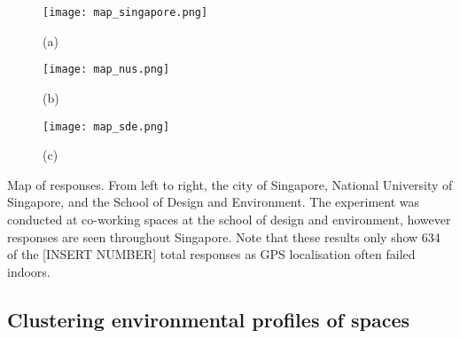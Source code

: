     \centering
    \begin{subfigure}[t]{0.3\textwidth}
        \centering
        \texttt{[image: map\_singapore.png]}
        \caption{(a)}
    \end{subfigure}
    \begin{subfigure}[t]{0.3\textwidth}
        \centering
        \texttt{[image: map\_nus.png]}
        \caption{(b)}
    \end{subfigure}
    \begin{subfigure}[t]{0.3\textwidth}
        \centering
        \texttt{[image: map\_sde.png]}
        \caption{(c)}
    \end{subfigure}
    \caption{Map of responses. From left to right, the city of Singapore, National University of Singapore, and the School of Design and Environment. The experiment was conducted at co-working spaces at the school of design and environment, however responses are seen throughout Singapore. Note that these results only show 634 of the [INSERT NUMBER] total responses as GPS localisation often failed indoors.}
    \label{fig:map}


\subsection{Clustering environmental profiles of spaces}
\label{ch:userResults}




